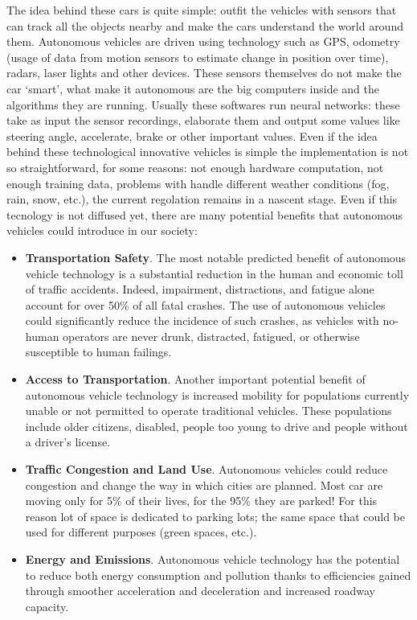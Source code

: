 \documentclass[14pt]{extarticle}
\def\ss{\vspace{25pt}}
\def\pp{\vspace{10pt}\newline}
\def\ppn{\vspace{10pt}}
\begin{document}
\begin{flushleft}
\ppn
The idea behind these cars is quite simple: outfit the vehicles with sensors that can track all the objects nearby and make the cars understand the world around them. Autonomous vehicles are driven using technology such as GPS, odometry (usage of data from motion sensors to estimate change in position over time), radars, laser lights and other devices\cite{AVlevels2}. These sensors themselves do not make the car ‘smart’, what make it autonomous are the big computers inside and the algorithms they are running. Usually these softwares run neural networks: these take as input the sensor recordings, elaborate them and output some values like steering angle, accelerate, brake or other important values. Even if the idea behind these technological innovative vehicles is simple the implementation is not so straightforward, for some reasons: not enough hardware computation, not enough training data, problems with handle different weather conditions (fog, rain, snow, etc.),  the current regolation remains in a nascent stage.
 \pp
Even if this tecnology is not diffused yet, there are many potential benefits that autonomous vehicles could introduce in our society:
 \begin{itemize}
 \item \textbf{Transportation Safety}. The most notable predicted benefit of autonomous vehicle technology is a substantial reduction in the human and economic toll of traffic accidents. Indeed, impairment, distractions, and fatigue alone account for over 50\% of all fatal crashes. The use of autonomous vehicles could significantly reduce the incidence of such crashes, as vehicles with no-human operators are never drunk, distracted, fatigued, or otherwise susceptible to human failings.
\item \textbf{Access to Transportation}. Another important potential benefit of autonomous vehicle technology is increased mobility for populations currently unable or not permitted to operate traditional vehicles. These populations include older
citizens, disabled, people too young to drive and people without a driver’s 
license.
\item \textbf{Traffic Congestion and Land Use}. Autonomous vehicles could reduce congestion and change the way in which cities are planned. Most car are moving only for 5\% of their lives, for the 95\% they are parked\cite{AVparking}! For this reason lot of space is dedicated to parking lots; the same space that could be used for different purposes (green spaces, etc.).
\item \textbf{Energy and Emissions}. Autonomous vehicle technology has the potential to reduce both energy consumption and pollution thanks to efficiencies gained through smoother acceleration and deceleration and  increased  roadway capacity.\cite{AVbenefit}
 \end{itemize}

	\ss
\end{flushleft}
\end{document}
